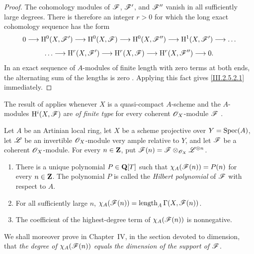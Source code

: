 \begin{proof}
The cohomology modules of $\mathscr{F}$, $\mathscr{F}'$, and $\mathscr{F}''$ vanish in all sufficiently large degrees.
There is therefore an integer $r>0$ for which the long exact cohomology sequence has the form
\[
  0\longrightarrow\mathrm{H}^0(X,\mathscr{F}')
  \longrightarrow\mathrm{H}^0(X,\mathscr{F})
  \longrightarrow\mathrm{H}^0(X,\mathscr{F}'')
  \longrightarrow\mathrm{H}^1(X,\mathscr{F}')
  \longrightarrow\ldots
\]
\[
  \ldots\longrightarrow\mathrm{H}^r(X,\mathscr{F}')
  \longrightarrow\mathrm{H}^r(X,\mathscr{F})
  \longrightarrow\mathrm{H}^r(X,\mathscr{F}'')
  \longrightarrow0.
\]
In an exact sequence of $A$-modules of finite length with zero terms at both ends, the alternating sum of the lengths is zero .
Applying this fact gives \eqref{III.2.5.2.1} immediately.
\end{proof}

The result of  applies whenever $X$ is a quasi-compact $A$-scheme and the $A$-modules $\mathrm{H}^i(X,\mathscr{F})$ are \emph{of finite type} for every coherent $\mathscr{O}_X$-module $\mathscr{F}$ .

\begin{theorem}[2.5.3]
\label{III.2.5.3}
Let $A$ be an Artinian local ring, let $X$ be a scheme projective over $Y=\operatorname{Spec}(A)$,
let $\mathscr{L}$ be an invertible $\mathscr{O}_X$-module very ample relative to $Y$, and let $\mathscr{F}$ be a coherent $\mathscr{O}_X$-module.
For every $n\in\mathbf{Z}$, put $\mathscr{F}(n)=\mathscr{F}\otimes_{\mathscr{O}_X}\mathscr{L}^{\otimes n}$.
\begin{enumerate}
  \item[\textup{(i)}] There is a unique polynomial $P\in\mathbf{Q}[T]$ such that $\chi_A(\mathscr{F}(n))=P(n)$
  for every $n\in\mathbf{Z}$.
  The polynomial $P$ is called the \emph{Hilbert polynomial} of $\mathscr{F}$ with respect to $A$.

  \item[\textup{(ii)}] For all sufficiently large $n$, $\chi_A(\mathscr{F}(n))
=
\operatorname{length}_A\Gamma(X,\mathscr{F}(n))$.

  \item[\textup{(iii)}] The coefficient of the highest-degree term of $\chi_A(\mathscr{F}(n))$ is nonnegative.
\end{enumerate}
\end{theorem}

We shall moreover prove in Chapter~IV, in the section devoted to dimension, that \emph{the degree of $\chi_A(\mathscr{F}(n))$ equals the dimension of the support of $\mathscr{F}$}.


